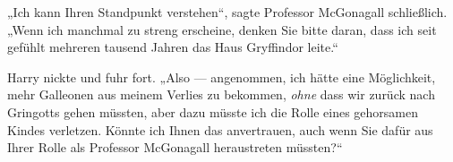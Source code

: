 






„Ich kann Ihren Standpunkt verstehen“, sagte Professor McGonagall schließlich.
„Wenn ich manchmal zu streng erscheine, denken Sie bitte daran, dass ich seit gefühlt mehreren tausend Jahren das Haus Gryffindor leite.“

Harry nickte und fuhr fort.
„Also — angenommen, ich hätte eine Möglichkeit, mehr Galleonen aus meinem Verlies zu bekommen, \emph{ohne} dass wir zurück nach Gringotts gehen müssten, aber dazu müsste ich die Rolle eines gehorsamen Kindes verletzen. Könnte ich Ihnen das anvertrauen, auch wenn Sie dafür aus Ihrer Rolle als Professor McGonagall heraustreten müssten?“

